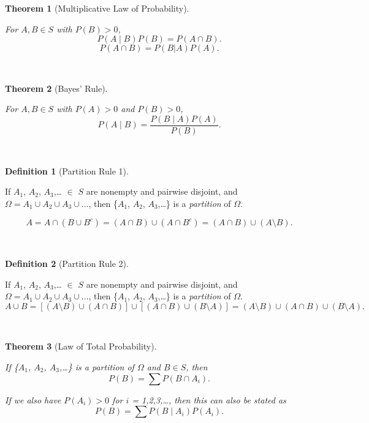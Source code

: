 \documentclass[
]{article}
\newtheorem{theorem}{Theorem}[section]
\theoremstyle{definition}
\newtheorem{definition}{Definition}[section]
\theoremstyle{definition}
\theoremstyle{definition}
\theoremstyle{remark}
\begin{document}
\begin{theorem}[Multiplicative Law of Probability]
\protect\hypertarget{thm:unlabeled-div-8}{}\label{thm:unlabeled-div-8}

For \(A, B \in S\) with \(P(B) > 0\),
\[P(A \mid B)P(B) = P(A \cap B).\]
\[P(A \cap B) = P(B|A)P(A).\]

~

\end{theorem}

\begin{theorem}[Bayes' Rule]
\protect\hypertarget{thm:unlabeled-div-9}{}\label{thm:unlabeled-div-9}

For \(A, B \in S\) with \(P(A) > 0\) and \(P(B) > 0\),
\[P(A \mid B) = \frac {P(B \mid A)P(A)}{P(B)}.\]

~

\end{theorem}

\begin{definition}[Partition Rule 1]
\protect\hypertarget{def:unlabeled-div-10}{}\label{def:unlabeled-div-10}

If \(A_1\), \(A_2\), \(A_3\),\ldots{} \(\in\) \(S\) are nonempty and pairwise disjoint, and \(\Omega = A_1 \cup A_2 \cup A_3 \cup ...\), then \{\(A_1\), \(A_2\), \(A_3\),\ldots\} is a \emph{partition} of \(\Omega\).

\[A = A \cap (B \cup B^c) = (A \cap B) \cup (A \cap B^c) = (A \cap B) \cup (A \setminus B).\]

~

\end{definition}

\begin{definition}[Partition Rule 2]
\protect\hypertarget{def:unlabeled-div-11}{}\label{def:unlabeled-div-11}

If \(A_1\), \(A_2\), \(A_3\),\ldots{} \(\in\) \(S\) are nonempty and pairwise disjoint, and \(\Omega = A_1 \cup A_2 \cup A_3 \cup ...\), then \{\(A_1\), \(A_2\), \(A_3\),\ldots\} is a \emph{partition} of \(\Omega\).
\[A \cup B = [(A \setminus B) \cup (A \cap B)] \cup [(A \cap B) \cup (B \setminus A)] = (A \setminus B) \cup (A \cap B) \cup (B \setminus A).\]

~

\end{definition}

\begin{theorem}[Law of Total Probability]
\protect\hypertarget{thm:unlabeled-div-12}{}\label{thm:unlabeled-div-12}

If \{\(A_1\), \(A_2\), \(A_3\),\ldots\} is a \emph{partition} of \(\Omega\) and \(B \in S\), then
\[P(B) = \sum P(B \cap A_i).\]

If we also have \(P(A_i) > 0\) for \(i\) = 1,2,3,\ldots, then this can also be stated as
\[P(B) = \sum P(B \mid A_i)P(A_i).\]

~

\end{theorem}
\end{document}
